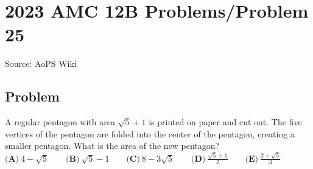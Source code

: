 \documentclass[12pt]{article}
\begin{document}
\section*{{2023 AMC 12B Problems/Problem 25}}
Source: AoPS Wiki

\subsection*{Problem}
A regular pentagon with area $\sqrt{5}+1$ is printed on paper and cut out. The five vertices of the pentagon are folded into the center of the pentagon, creating a smaller pentagon. What is the area of the new pentagon? $\textbf{(A)}~4-\sqrt{5}\qquad\textbf{(B)}~\sqrt{5}-1\qquad\textbf{(C)}~8-3\sqrt{5}\qquad\textbf{(D)}~\frac{\sqrt{5}+1}{2}\qquad\textbf{(E)}~\frac{2+\sqrt{5}}{3}$
\end{document}
